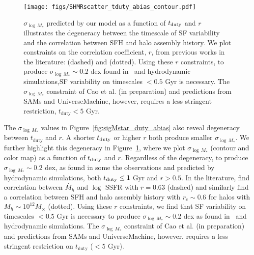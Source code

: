 \documentclass[12pt, letterpaper, preprint, tighten]{aastex62}
\begin{document}
\begin{figure}
\begin{center}
\texttt{[image: figs/SHMRscatter\_tduty\_abias\_contour.pdf]}
    \caption{$\sigma_{\log\,M_*}$ predicted by our model as a function of 
    $t_{\rm duty}$ and $r$ illustrates the degeneracy between the timescale of 
    SF variability and the correlation between SFH and halo assembly history. 
    We plot constraints on the correlation coefficient, $r$, from previous
    works in the literature: \cite{tinker2018b} (dashed) and \cite{behroozi2018} 
    (dotted). Using these $r$ constraints, to produce $\sigma_{\log\,M_*} \sim 0.2$ dex
    found in~\cite{more2011, leauthaud2012, reddick2013, tinker2013, zu2015} and 
    hydrodynamic simulations,SF variability on timescales $< 0.5$ Gyr is necessary.
    The $\sigma_{\log\,M_*}$ constraint of Cao et al. (in preparation) and predictions 
    from SAMs and {\sc UniverseMachine}, however, requires a less stringent 
    restriction, $t_\mathrm{duty} < 5$ Gyr. 
    }
\label{fig:r_tduty}
\end{center}
\end{figure}

The $\sigma_{\log\,M_*}$ values in Figure~\ref{fig:sigMstar_duty_abias} 
also reveal degeneracy between $t_\mathrm{duty}$ and $r$. A shorter
$t_{\rm duty}$ or higher $r$ both produce smaller $\sigma_{\log\,M_*}$. 
We further highlight this degeneracy in Figure~\ref{fig:r_tduty}, where 
we plot $\sigma_{\log\,M_*}$ (contour and color map) as a function of 
$t_{\rm duty}$ and $r$. Regardless of the degeneracy, to produce 
$\sigma_{\log\,M_*} \sim 0.2$ dex, as found in some the observations 
and predicted by hydrodynamic simulations, both $t_{\rm duty} \leq 1$ Gyr 
and $r > 0.5$. In the literature, \cite{tinker2018b} find correlation 
between $\dot{M_h}$ and $\log$ SSFR with $r = 0.63$ (dashed) and 
\cite{behroozi2018} similarly find a correlation between SFH and halo 
assembly history with $r_c \sim 0.6$ for halos with $M_h \sim 10^{12}M_\odot$ 
(dotted). Using these $r$ constraints, we find that SF variability on 
timescales $< 0.5$ Gyr is necessary to produce $\sigma_{\log\,M_*} \sim 0.2$ dex
as found in~\cite{more2011, leauthaud2012, reddick2013, tinker2013, zu2015} 
and hydrodynamic simulations. The $\sigma_{\log\,M_*}$ constraint of 
Cao et al. (in preparation) and predictions from SAMs and {\sc UniverseMachine}, 
however, requires a less stringent restriction on $t_\mathrm{duty}$ ($< 5$ Gyr). 
\end{document}
